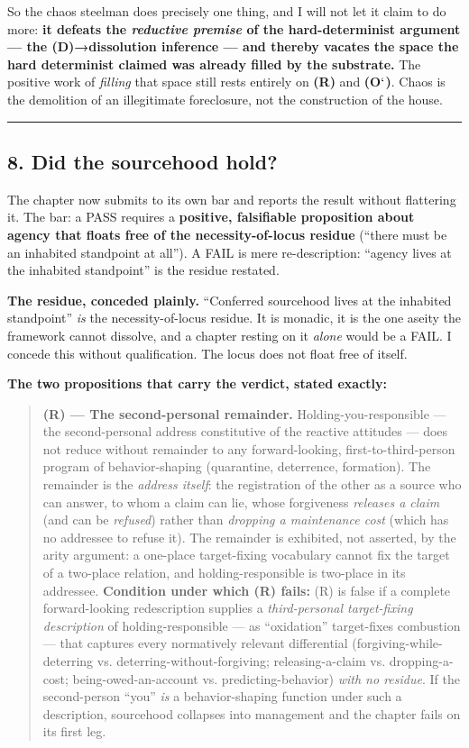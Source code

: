\documentclass[11pt]{article}
\begin{document}
So the chaos steelman does precisely one thing, and I will not let it claim to do more: \textbf{it defeats the \emph{reductive premise} of the hard-determinist argument — the (D)→dissolution inference — and thereby vacates the space the hard determinist claimed was already filled by the substrate.} The positive work of \emph{filling} that space still rests entirely on \textbf{(R)} and \textbf{(O\ensuremath{`})}. Chaos is the demolition of an illegitimate foreclosure, not the construction of the house.

\medskip\noindent\rule{\linewidth}{0.3pt}\medskip

\subsection*{8. Did the sourcehood hold?}

The chapter now submits to its own bar and reports the result without flattering it. The bar: a PASS requires a \textbf{positive, falsifiable proposition about agency that floats free of the necessity-of-locus residue} (``there must be an inhabited standpoint at all''). A FAIL is mere re-description: ``agency lives at the inhabited standpoint'' is the residue restated.

\textbf{The residue, conceded plainly.} ``Conferred sourcehood lives at the inhabited standpoint'' \emph{is} the necessity-of-locus residue. It is monadic, it is the one aseity the framework cannot dissolve, and a chapter resting on it \emph{alone} would be a FAIL. I concede this without qualification. The locus does not float free of itself.

\textbf{The two propositions that carry the verdict, stated exactly:}

\begin{quote}
\textbf{(R) — The second-personal remainder.} Holding-you-responsible — the second-personal address constitutive of the reactive attitudes — does not reduce without remainder to any forward-looking, first-to-third-person program of behavior-shaping (quarantine, deterrence, formation). The remainder is the \emph{address itself}: the registration of the other as a source who can answer, to whom a claim can lie, whose forgiveness \emph{releases a claim} (and can be \emph{refused}) rather than \emph{dropping a maintenance cost} (which has no addressee to refuse it). The remainder is exhibited, not asserted, by the arity argument: a one-place target-fixing vocabulary cannot fix the target of a two-place relation, and holding-responsible is two-place in its addressee. \textbf{Condition under which (R) fails:} (R) is false if a complete forward-looking redescription supplies a \emph{third-personal target-fixing description} of holding-responsible — as ``oxidation'' target-fixes combustion — that captures every normatively relevant differential (forgiving-while-deterring vs. deterring-without-forgiving; releasing-a-claim vs. dropping-a-cost; being-owed-an-account vs. predicting-behavior) \emph{with no residue}. If the second-person ``you'' \emph{is} a behavior-shaping function under such a description, sourcehood collapses into management and the chapter fails on its first leg.
\end{quote}
\end{document}
